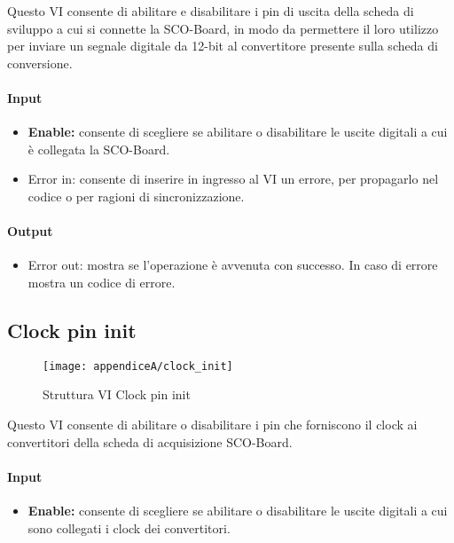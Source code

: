 Questo VI consente di abilitare e disabilitare i pin di uscita della scheda di sviluppo a cui si connette la SCO-Board, in modo da permettere il loro utilizzo per inviare un segnale digitale da 12-bit al convertitore presente sulla scheda di conversione.

\paragraph{Input}
\begin{itemize}
	\item \textbf{Enable:} consente di scegliere se abilitare o disabilitare le uscite digitali a cui è collegata la SCO-Board.
	\item Error in: consente di inserire in ingresso al VI un errore, per propagarlo nel codice o per ragioni di sincronizzazione.
\end{itemize}

\paragraph*{Output}
\begin{itemize}
	\item Error out: mostra se l'operazione è avvenuta con successo. In caso di errore mostra un codice di errore.
\end{itemize}

\subsection*{Clock pin init}

\begin{figure}[H]
	\begin{center}
		\texttt{[image: appendiceA/clock\_init]}
		\caption{Struttura VI Clock pin init}
	\end{center}
\end{figure}

Questo VI consente di abilitare o disabilitare i pin che forniscono il clock ai convertitori della scheda di acquisizione SCO-Board.
\paragraph*{Input}
\begin{itemize}
	\item \textbf{Enable:} consente di scegliere se abilitare o disabilitare le uscite digitali a cui sono collegati i clock dei convertitori.
\end{itemize}

